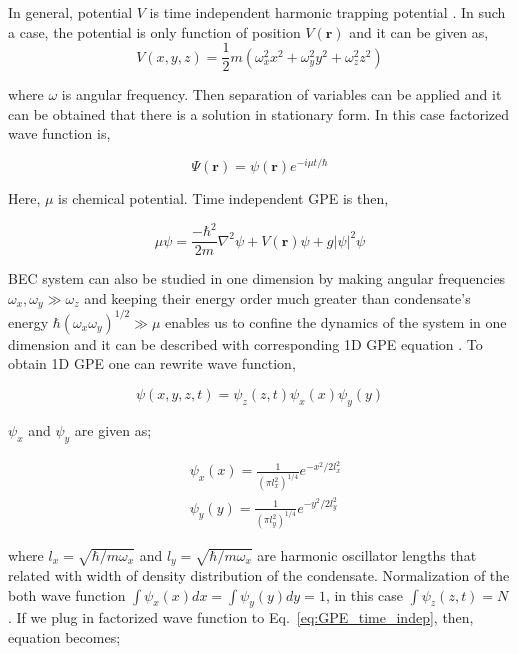 \documentclass[a4paper,times,12pt]{article}
\begin{document}
In general, potential $V$ is time independent harmonic trapping potential \cite{barenghi2016primer}. In such a case, the potential is only function of position $V(\boldsymbol{r})$ and it can be given as,
\begin{equation}
\label{eq:GPE_harmonic_potential}
V(x, y, z) = \frac{1}{2}m(\omega_x^2 x^2 + \omega_y^2y^2 + \omega_z^2z^2)
\end{equation}


\noindent where $\omega$ is angular frequency. Then separation of variables can be applied and it can be obtained that there is a solution in stationary form. In this case factorized wave function is,

\begin{equation}
\label{eq:GPE_time_indep_wave_func}
\Psi(\boldsymbol{r}) = \psi(\boldsymbol{r})e^{-i\mu t/\hbar}
\end{equation}

\noindent Here, $\mu$ is chemical potential. Time independent GPE is then,

\begin{equation}
\label{eq:GPE_time_indep}
\mu\psi = \frac{-\hbar^2}{2m}\nabla^2\psi + V(\boldsymbol{r})\psi + g|\psi|^2\psi 
\end{equation}

BEC system can also be studied in one dimension by making angular frequencies $\omega_x, \omega_y \gg \omega_z$ and keeping their energy order much greater than condensate's energy $ \hbar(\omega_x \omega_y)^{1/2} \gg \mu $ enables us to confine the dynamics of the system in one dimension and it can be described with corresponding 1D GPE equation \cite{barenghi2016primer}. To obtain 1D GPE one can rewrite wave function,

\begin{equation}
\label{eq:GPE_time_indep_wave_func_seperated}
\psi(x, y, z, t) = \psi_z(z, t)\psi_x(x)\psi_y(y)
\end{equation}

\noindent $\psi_x$ and $\psi_y$ are given as;

\begin{equation}
\begin{split}
\label{eq:GPE_x_y_wave}
& \psi_x(x) = \frac{1}{{(\pi l_x^2)}^{1/4}}e^{-x^2/2l_x^2} \\
& \psi_y(y) = \frac{1}{{(\pi l_y^2)}^{1/4}}e^{-y^2/2l_y^2}
\end{split}
\end{equation}

\noindent where $l_x = \sqrt{\hbar/m\omega_x}$ and $l_y = \sqrt{\hbar/m\omega_x}$ are harmonic oscillator lengths that related with width of density distribution of the condensate. Normalization of the both wave function $\int \psi_x(x)dx = \int \psi_y(y)dy = 1$, in this case $\int \psi_z(z, t) = N$. If we plug in factorized wave function to Eq.~\ref{eq:GPE_time_indep}, then, equation becomes;
\end{document}
